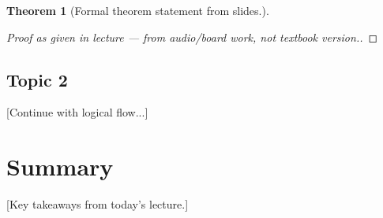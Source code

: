 \documentclass[11pt,a4paper]{article}
\theoremstyle{definition}
\newtheorem{theorem}{Theorem}[section]
\begin{document}
\begin{theorem}
[Formal theorem statement from slides.]
\end{theorem}

\begin{proof}
[Proof as given in lecture — from audio/board work, not textbook version.]
\end{proof}

\begin{intuition}
\end{intuition}

\subsection{Topic 2}

[Continue with logical flow...]

\section{Summary}

[Key takeaways from today's lecture.]
\end{document}
